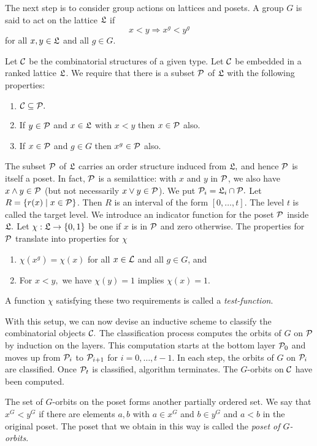 The next step is to consider group actions on lattices and posets.
A group $G$ is said to act on the lattice ${\mathfrak L}$ if
$$
x < y \Rightarrow x^g < y^g
$$
for all $x,y \in {\mathfrak L}$ and all $g \in G.$


\bigskip


Let ${\cal C}$ be the combinatorial structures of a given type.
Let ${\cal C}$ be embedded in a ranked lattice ${\mathfrak L}$.
We require that there is a subset ${\cal P}$ of 
${\mathfrak L}$ with the following properties:
\begin{enumerate}
\item 
${\cal C} \subseteq {\cal P}.$
\item
If $y \in {\cal P}$ and 
$x \in {\mathfrak L}$ with $x < y$ then $x \in {\cal P}$ also. 
\item
If $x \in {\cal P}$ and $g \in G$ then $x^g \in {\cal P}$ also.
\end{enumerate}
The subset ${\cal P}$ of ${\mathfrak L}$ carries an order structure induced from ${\mathfrak L},$ 
and hence ${\cal P}$ is itself a poset. 
In fact, ${\cal P}$ is a semilattice: 
with $x$ and $y$ in ${\cal P}$, we also have $x \wedge y \in {\cal P}$  
(but not necessarily $x \vee y \in {\cal P}$).
We put ${\cal P}_i = {\mathfrak L}_i \cap {\cal P}.$
Let $R =  \{ r(x) \mid x \in {\cal P} \}$. Then $R$ is an interval of the form $[0,\ldots,t].$
The level $t$ is called the target level.
We introduce an indicator function for the poset ${\cal P}$ inside ${\mathfrak L}.$ 
Let $\chi: {\mathfrak L} \rightarrow \{0,1\}$ be one if $x$ is in ${\cal P}$ and zero otherwise.
The properties for ${\cal P}$ translate into properties for $\chi$
\begin{enumerate}
\item
$\chi(x^g) = \chi(x)$ for all $x \in {\cal L}$ and all $g \in G$, and
\item
For $x < y,$ we have $\chi(y) = 1$ implies $\chi(x) = 1.$ 
\end{enumerate}
A function $\chi$ satisfying these two requirements is called a {\em test-function}.



\bigskip

With this setup, we can now devise an inductive scheme to classify 
the combinatorial objects ${\cal C}.$
The classification process computes the orbits of $G$ on ${\cal P}$ by induction on the layers. 
This computation starts at the bottom layer ${\cal P}_0$ and moves up 
from ${\cal P}_i$ to ${\cal P}_{i+1}$ for $i =0,\ldots,t-1.$ 
In each step, the orbits of $G$ on ${\cal P}_i$ are classified.
Once ${\cal P}_t$ is classified, algorithm terminates. 
The $G$-orbits on ${\cal C}$ have been computed.

\bigskip

The set of $G$-orbits on the poset 
forms another partially ordered set. 
We say that  $x^G < y^G$ if there are elements 
$a,b$ with $a \in x^G$ and $b \in y^G$ and $a < b$ in the original poset.
The poset that we obtain in this way is called the {\em poset of $G$-orbits}. 


\bigskip




